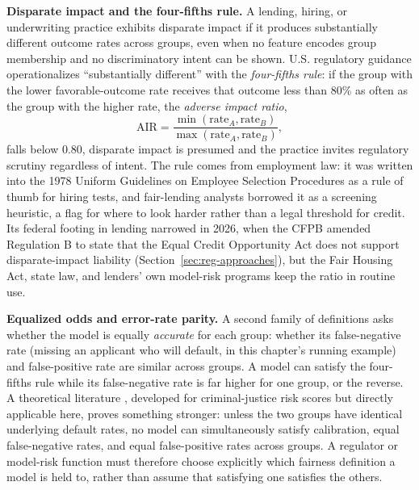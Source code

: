 \documentclass[../ai_in_finance]{subfiles}
\begin{document}
\textbf{Disparate impact and the four-fifths rule.} A lending, hiring, or underwriting practice exhibits disparate impact if it produces substantially different outcome rates across groups, even when no feature encodes group membership and no discriminatory intent can be shown. U.S. regulatory guidance operationalizes ``substantially different'' with the \emph{four-fifths rule}: if the group with the lower favorable-outcome rate receives that outcome less than 80\% as often as the group with the higher rate, the \emph{adverse impact ratio},
\begin{equation}
\text{AIR} = \frac{\min(\text{rate}_A, \text{rate}_B)}{\max(\text{rate}_A, \text{rate}_B)},
\label{eq:xai-air}
\end{equation}
falls below 0.80, disparate impact is presumed and the practice invites regulatory scrutiny regardless of intent. The rule comes from employment law: it was written into the 1978 Uniform Guidelines on Employee Selection Procedures \parencite{eeoc1978uniform} as a rule of thumb for hiring tests, and fair-lending analysts borrowed it as a screening heuristic, a flag for where to look harder rather than a legal threshold for credit. Its federal footing in lending narrowed in 2026, when the CFPB amended Regulation B to state that the Equal Credit Opportunity Act does not support disparate-impact liability (Section~\ref{sec:reg-approaches}), but the Fair Housing Act, state law, and lenders' own model-risk programs keep the ratio in routine use.

\textbf{Equalized odds and error-rate parity.} A second family of definitions asks whether the model is equally \emph{accurate} for each group: whether its false-negative rate (missing an applicant who will default, in this chapter's running example) and false-positive rate are similar across groups. A model can satisfy the four-fifths rule while its false-negative rate is far higher for one group, or the reverse. A theoretical literature \parencite{chouldechova2017fair,kleinberg2017inherent}, developed for criminal-justice risk scores but directly applicable here, proves something stronger: unless the two groups have identical underlying default rates, no model can simultaneously satisfy calibration, equal false-negative rates, and equal false-positive rates across groups. A regulator or model-risk function must therefore choose explicitly which fairness definition a model is held to, rather than assume that satisfying one satisfies the others.
\end{document}
